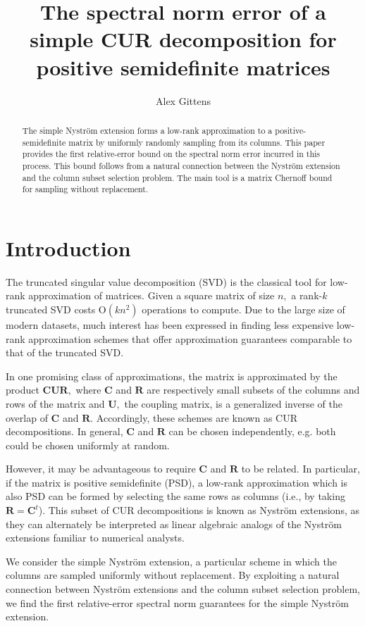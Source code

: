 \documentclass[11pt,letterpaper,twoside,reqno,nosumlimits]{amsart}
\title[The simple Nystr\"om extension]{The spectral norm error of a simple CUR decomposition for positive semidefinite matrices}
\author{Alex Gittens}
\newcommand{\mat}[1]{\ensuremath{\bm{#1}}}
\theoremstyle{remark}
\begin{document}
\begin{abstract}The simple Nystr\"om extension forms a low-rank approximation to a positive-semidefinite matrix by uniformly randomly sampling from its columns. This paper provides the first relative-error bound on the spectral norm error incurred in this process. This bound follows from a natural connection between the Nystr\"om extension and the column subset selection problem. The main tool is a matrix Chernoff bound for sampling without replacement.
\end{abstract}
\maketitle


\section{Introduction}
The truncated singular value decomposition (SVD) is the classical tool for low-rank approximation of matrices. Given a square matrix of size $n,$ a rank-$k$ truncated SVD costs $\mathrm{O}(kn^2)$ operations to compute. Due to the large size of modern datasets, much interest has been expressed in finding less expensive low-rank approximation schemes that offer approximation guarantees comparable to that of the truncated SVD. 

In one promising class of approximations, the matrix is approximated by the product $\mat{C}\mat{U}\mat{R},$ where $\mat{C}$ and $\mat{R}$ are respectively small subsets of the columns and rows of the matrix and $\mat{U},$ the coupling matrix, is a generalized inverse of the overlap of $\mat{C}$ and $\mat{R}.$ Accordingly, these schemes are known as CUR decompositions. In general, $\mat{C}$ and $\mat{R}$ can be chosen independently, e.g. both could be chosen uniformly at random. 

However, it may be advantageous to require $\mat{C}$ and $\mat{R}$ to be related. In particular, if the matrix is positive semidefinite (PSD), a low-rank approximation which is also PSD can be formed by selecting the same rows as columns (i.e., by taking $\mat{R} = \mat{C}^t$). This subset of CUR decompositions is known as Nystr\"om extensions, as they can alternately be interpreted as linear algebraic analogs of the Nystr\"om extensions familiar to numerical analysts. 

We consider the simple Nystr\"om extension, a particular scheme in which the columns are sampled uniformly without replacement. By exploiting a natural connection between Nystr\"om extensions and the column subset selection problem, we find the first relative-error spectral norm guarantees for the simple Nystr\"om extension.
\end{document}
